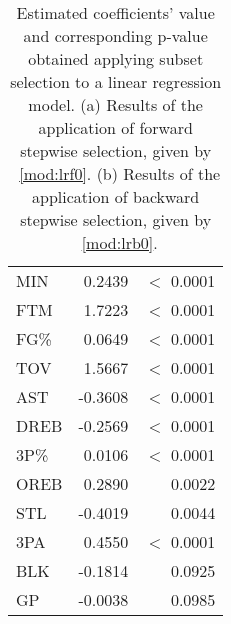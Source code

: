 \begin{table}[h]
\begin{subtable}{0.4\textwidth}
{\begin{tabular}{|| l | r | r ||}
			MIN & 0.2439 & $<$ 0.0001 \\
			FTM & 1.7223 & $<$ 0.0001 \\
			FG\% & 0.0649 & $<$ 0.0001 \\
			TOV & 1.5667 & $<$ 0.0001 \\
			AST & -0.3608 & $<$ 0.0001 \\
			DREB & -0.2569 & $<$ 0.0001 \\
			3P\% & 0.0106 & $<$ 0.0001 \\
			OREB & 0.2890 & 0.0022 \\
			STL & -0.4019 & 0.0044 \\
			3PA & 0.4550 & $<$ 0.0001 \\
			BLK & -0.1814 & 0.0925 \\
			GP & -0.0038 & 0.0985 \\
			\hline
		\end{tabular}%
		}	
		\caption{}
		\label{table:BackwardModelSummary}
	\end{subtable}
	\caption{Estimated coefficients' value and corresponding p-value obtained applying subset selection to a linear regression model. (a) Results of the application of forward stepwise selection, given by \Mod~\ref{mod:lrf0}. (b) Results of the application of backward stepwise selection, given by \Mod~\ref{mod:lrb0}.}
	\label{table:SubSelModSum}
\end{table}

\clearpage

\begin{center}
\end{center}

\begin{center}
\end{center}

